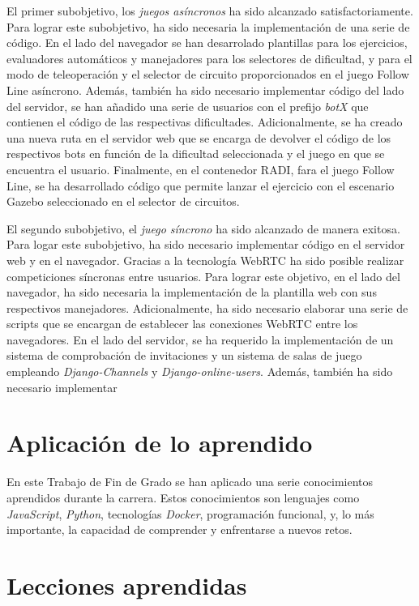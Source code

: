 \documentclass[a4paper, 12pt]{book}
\begin{document}
El primer subobjetivo, los \emph{juegos asíncronos} ha sido alcanzado satisfactoriamente. Para lograr este subobjetivo, ha sido necesaria la implementación de una serie de código. En el lado del navegador se han desarrolado plantillas para los ejercicios, evaluadores automáticos y manejadores para los selectores de dificultad, y para el modo de teleoperación y el selector de circuito proporcionados en el juego Follow Line asíncrono. Además, también ha sido necesario implementar código del lado del servidor, se han añadido una serie de usuarios con el prefijo \emph{botX} que contienen el código de las respectivas dificultades. Adicionalmente, se ha creado una nueva ruta en el servidor web que se encarga de devolver el código de los respectivos bots en función de la dificultad seleccionada y el juego en que se encuentra el usuario. Finalmente, en el contenedor RADI, fara el juego Follow Line, se ha desarrollado código que permite lanzar el ejercicio con el escenario Gazebo seleccionado en el selector de circuitos.

El segundo subobjetivo, el \emph{juego síncrono} ha sido alcanzado de manera exitosa. Para logar este subobjetivo, ha sido necesario implementar código en el servidor web y en el navegador. Gracias a la tecnología WebRTC ha sido posible realizar competiciones síncronas entre usuarios. Para lograr este objetivo, en el lado del navegador, ha sido necesaria la implementación de la plantilla web con sus respectivos manejadores. Adicionalmente, ha sido necesario elaborar una serie de scripts que se encargan de establecer las conexiones WebRTC entre los navegadores. En el lado del servidor, se ha requerido la implementación de un sistema de comprobación de invitaciones y un sistema de salas de juego empleando \emph{Django-Channels} y \emph{Django-online-users}. Además, también ha sido necesario implementar 

\section{Aplicación de lo aprendido}
\label{sec:aplicacion}

En este Trabajo de Fin de Grado se han aplicado una serie conocimientos aprendidos durante la carrera. Estos conocimientos son lenguajes como \emph{JavaScript}, \emph{Python}, tecnologías \emph{Docker}, programación funcional, y, lo más importante, la capacidad de comprender y enfrentarse a nuevos retos.


\section{Lecciones aprendidas}
\label{sec:lecciones_aprendidas}
\end{document}
